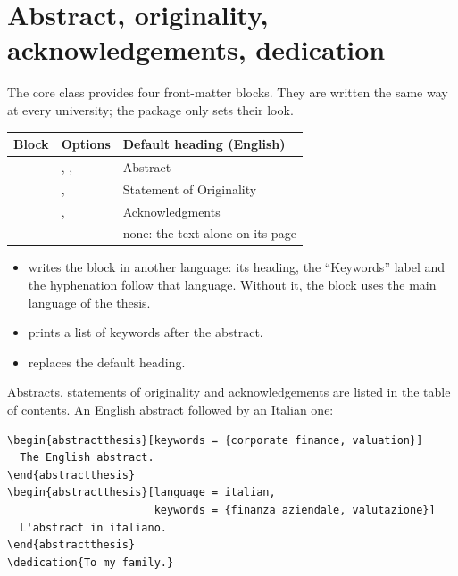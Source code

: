 \section{Abstract, originality, acknowledgements, dedication}
\label{sec:blocks}

The core class provides four front-matter blocks. They are written the
same way at every university; the \unishort{} package only sets their look.

\begin{tabularx}{\textwidth}{@{}l l Y@{}}
\toprule
\textbf{Block} & \textbf{Options} & \textbf{Default heading (English)} \\
\midrule
{} & , ,  & Abstract \\
 & ,  & Statement of Originality \\
 & ,  & Acknowledgments \\
 &  & none: the text alone on its page \\
\bottomrule
\end{tabularx}

\begin{itemize}
  \item {} writes the block in another language: its heading,
    the ``Keywords'' label and the hyphenation follow that language.
    Without it, the block uses the main language of the thesis.
    \uniotherlangnote
  \item {} prints a list of keywords after the abstract.
  \item {} replaces the default heading.
\end{itemize}

Abstracts, statements of originality and acknowledgements are listed in
the table of contents. An English abstract followed by an Italian one:

\begin{lstlisting}
\begin{abstractthesis}[keywords = {corporate finance, valuation}]
  The English abstract.
\end{abstractthesis}
\begin{abstractthesis}[language = italian,
                       keywords = {finanza aziendale, valutazione}]
  L'abstract in italiano.
\end{abstractthesis}
\dedication{To my family.}
\end{lstlisting}

